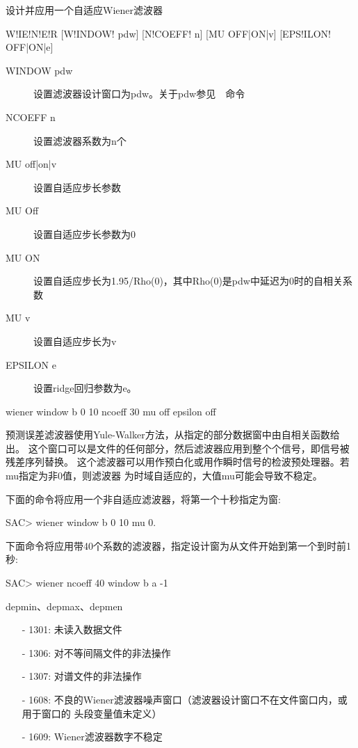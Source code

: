 \label{cmd:wiener}

设计并应用一个自适应Wiener滤波器

\begin{SACSTX}
W!IE!N!E!R [W!INDOW! pdw] [N!COEFF! n] [MU OFF|ON|v] [EPS!ILON! OFF|ON|e]
\end{SACSTX}

\begin{description}
\item [WINDOW pdw] 设置滤波器设计窗口为pdw。关于pdw参见~~命令 
\item [NCOEFF n] 设置滤波器系数为n个 
\item [MU off|on|v] 设置自适应步长参数 
\item [MU Off] 设置自适应步长参数为0
\item [MU ON] 设置自适应步长为1.95/Rho(0)，其中Rho(0)是pdw中延迟为0时的自相关系数
\item [MU v] 设置自适应步长为v
\item [EPSILON e] 设置ridge回归参数为e。
\end{description}

\begin{SACDFT}
wiener window b 0 10 ncoeff 30 mu off epsilon off
\end{SACDFT}

预测误差滤波器使用Yule-Walker方法，从指定的部分数据窗中由自相关函数给出。
这个窗口可以是文件的任何部分，然后滤波器应用到整个个信号，即信号被残差序列替换。
这个滤波器可以用作预白化或用作瞬时信号的检波预处理器。若mu指定为非0值，则滤波器
为时域自适应的，大值mu可能会导致不稳定。

下面的命令将应用一个非自适应滤波器，将第一个十秒指定为窗:
\begin{SACCode}
SAC> wiener window b 0 10 mu 0.
\end{SACCode}

下面命令将应用带40个系数的滤波器，指定设计窗为从文件开始到第一个到时前1秒:
\begin{SACCode}
SAC> wiener ncoeff 40 window b a -1
\end{SACCode}

depmin、depmax、depmen

\begin{itemize}
\item[-]1301: 未读入数据文件
\item[-]1306: 对不等间隔文件的非法操作
\item[-]1307: 对谱文件的非法操作
\item[-]1608: 不良的Wiener滤波器噪声窗口（滤波器设计窗口不在文件窗口内，或用于窗口的
    头段变量值未定义）
\end{itemize}

\begin{itemize}
\item[-]1609: Wiener滤波器数字不稳定
\end{itemize}

